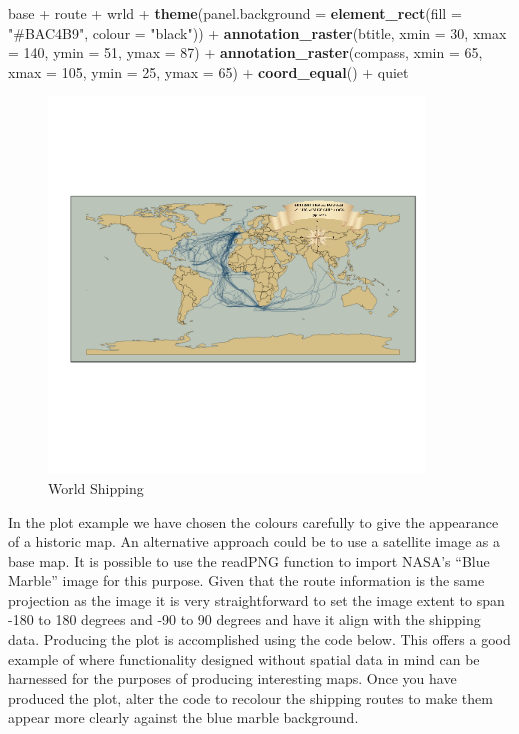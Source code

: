 \documentclass[]{article}
\newenvironment{Shaded}{}{}
\newcommand{\KeywordTok}[1]{\textcolor[rgb]{0.00,0.44,0.13}{\textbf{{#1}}}}
\newcommand{\DataTypeTok}[1]{\textcolor[rgb]{0.56,0.13,0.00}{{#1}}}
\newcommand{\DecValTok}[1]{\textcolor[rgb]{0.25,0.63,0.44}{{#1}}}
\newcommand{\StringTok}[1]{\textcolor[rgb]{0.25,0.44,0.63}{{#1}}}
\newcommand{\NormalTok}[1]{{#1}}
\let\Oldincludegraphics\includegraphics
\renewcommand{\includegraphics}[1]{\Oldincludegraphics[width=10cm]{#1}}
\begin{document}
\begin{Shaded}
\begin{Highlighting}[]
\NormalTok{base + route + wrld + }\KeywordTok{theme}\NormalTok{(}\DataTypeTok{panel.background =} \KeywordTok{element_rect}\NormalTok{(}\DataTypeTok{fill =} \StringTok{"#BAC4B9"}\NormalTok{, }
    \DataTypeTok{colour =} \StringTok{"black"}\NormalTok{)) + }\KeywordTok{annotation_raster}\NormalTok{(btitle, }\DataTypeTok{xmin =} \DecValTok{30}\NormalTok{, }\DataTypeTok{xmax =} \DecValTok{140}\NormalTok{, }\DataTypeTok{ymin =} \DecValTok{51}\NormalTok{, }
    \DataTypeTok{ymax =} \DecValTok{87}\NormalTok{) + }\KeywordTok{annotation_raster}\NormalTok{(compass, }\DataTypeTok{xmin =} \DecValTok{65}\NormalTok{, }\DataTypeTok{xmax =} \DecValTok{105}\NormalTok{, }\DataTypeTok{ymin =} \DecValTok{25}\NormalTok{, }
    \DataTypeTok{ymax =} \DecValTok{65}\NormalTok{) + }\KeywordTok{coord_equal}\NormalTok{() + quiet}
\end{Highlighting}
\end{Shaded}
\begin{figure}[htbp]
\centering
\includegraphics{figure/World_Shipping.png}
\caption{World Shipping}
\end{figure}

In the plot example we have chosen the colours carefully to give the
appearance of a historic map. An alternative approach could be to use a
satellite image as a base map. It is possible to use the readPNG
function to import NASA's ``Blue Marble'' image for this purpose. Given
that the route information is the same projection as the image it is
very straightforward to set the image extent to span -180 to 180 degrees
and -90 to 90 degrees and have it align with the shipping data.
Producing the plot is accomplished using the code below. This offers a
good example of where functionality designed without spatial data in
mind can be harnessed for the purposes of producing interesting maps.
Once you have produced the plot, alter the code to recolour the shipping
routes to make them appear more clearly against the blue marble
background.
\end{document}
